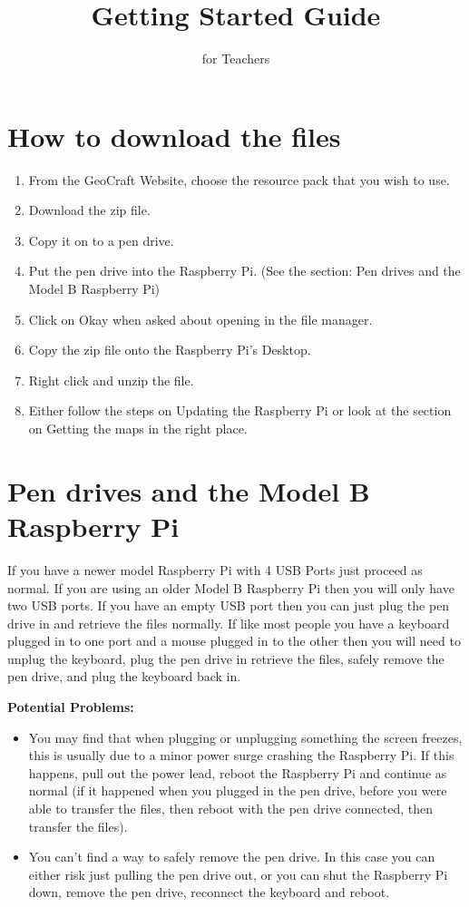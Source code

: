 \documentclass{geocraft-worksheet-multipage}
\begin{document}
\title{Getting Started Guide}
\subtitle{for Teachers}
\date{}

\maketitle
 
\section*{How to download the files}
\begin{enumerate}
\item From the GeoCraft Website, choose the resource pack that you wish to
use.
\item Download the zip file.
\item Copy it on to a pen drive.
\item Put the pen drive into the Raspberry Pi. (See the section: Pen
  drives and the Model B Raspberry Pi)
\item Click on Okay when asked about opening in the file manager.
\item Copy the zip file onto the Raspberry Pi's Desktop.
\item Right click and unzip the file.
\item Either follow the steps on Updating the Raspberry Pi or look at
  the section on Getting the maps in the right place.
\end{enumerate}

\section*{Pen drives and the Model B Raspberry Pi}
If you have a newer model Raspberry Pi with 4 USB Ports just proceed
as normal. If you are using an older Model B Raspberry Pi then you
will only have two USB ports. If you have an empty USB port then you
can just plug the pen drive in and retrieve the files normally. If
like most  people you have a keyboard plugged in to one port and a
mouse plugged in to the other then you will need to unplug the
keyboard, plug the pen drive in retrieve the files, safely remove the
pen drive, and plug the keyboard back in.

\textbf{Potential Problems:}
\begin{itemize}
\item You may find that when plugging or unplugging something the
  screen freezes, this is usually due to a minor power surge crashing
  the Raspberry Pi. If this happens, pull out the power lead, reboot
  the Raspberry Pi and continue as normal (if it happened when you
  plugged in the pen drive, before you were able to transfer the
  files, then reboot with the pen drive connected, then transfer the
  files). 
\item You can't find a way to safely remove the pen drive. In this
  case you can either risk just pulling the pen drive out, or you can
  shut the Raspberry Pi down, remove the pen drive, reconnect the
  keyboard and reboot.
\end{itemize}
\end{document}
